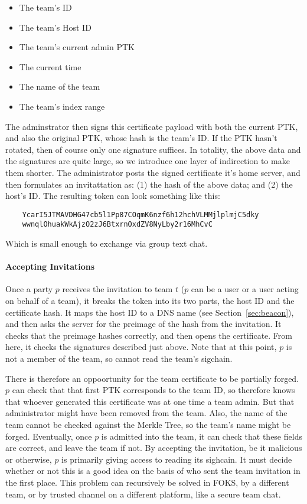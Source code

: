 \begin{itemize}[noitemsep]
    \item The team's ID
    \item The team's Host ID
    \item The team's current admin PTK
    \item The current time
    \item The name of the team
    \item The team's index range
\end{itemize}
%
The adminstrator then signs this certificate payload with both the current PTK, 
and also the original PTK, whose hash is the team's ID.  If the PTK hasn't rotated,
then of course only one signature suffices. In totality, the above data and the signatures
are quite large, so we introduce one layer of indirection to make them shorter. 
The administrator posts the signed certificate it's home server, and then formulates
an invitattation as: (1) the hash of the above data; and (2) the host's ID. The
resulting token can look something like this:
%
\begin{verbatim}
    YcarI5JTMAVDHG47cb5l1Pp87COqmK6nzf6h12hchVLMMjlplmjC5dky
    wwnqlOhuakWkAjzO2zJ6BtxrnOxdZV8NyLby2r16MhCvC
\end{verbatim}
% 
Which is small enough to exchange via group text chat.

\paragraph{Accepting Invitations}

Once a party $p$ receives the invitation to team $t$ ($p$ can be a user or a
user acting on behalf of a team), it breaks the token into its two parts, the
host ID and the certificate hash. It maps the host ID to a DNS name (see
Section~\ref{sec:beacon}), and then asks the server for the preimage of the hash
from the invitation. It checks that the preimage hashes correctly, and then
opens the certificate. From here, it checks the signatures described just above.
Note that at this point, $p$ is not a member of the team, so cannot read the
team's sigchain. 

There is therefore an oppoortunity for the team certificate to be partially
forged. $p$ can check that that first PTK corresponds to the team ID, so
therefore knows that whoever generated this certificate was at one time a team
admin.  But that administrator might have been removed from the team. Also, the
name of the team cannot be checked against the Merkle Tree, so the team's name
might be forged. Eventually, once $p$ is admitted into the team, it can check
that these fields are correct, and leave the team if not.  By accepting the
invitation, be it malicious or otherwise, $p$ is primarily giving access to
reading its sighcain. It must decide whether or not this is a good idea on the
basis of who sent the team invitation in the first place. This problem can
recursively be solved in FOKS, by a different team, or by trusted channel on a
different platform, like a secure team chat.

